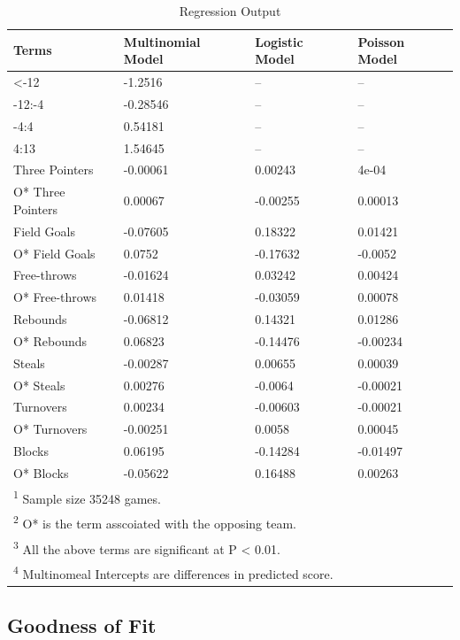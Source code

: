 \documentclass[
  man,floatsintext]{apa6}
\begin{document}
\begin{longtable}[t]{llll}
\caption{\label{tab:unnamed-chunk-5}Regression Output}\\
\toprule
Terms & Multinomial Model & Logistic Model & Poisson Model\\
\midrule
<-12 & -1.2516 & -- & --\\
-12:-4 & -0.28546 & -- & --\\
-4:4 & 0.54181 & -- & --\\
4:13 & 1.54645 & -- & --\\
Three Pointers & -0.00061 & 0.00243 & 4e-04\\
\addlinespace
O* Three Pointers & 0.00067 & -0.00255 & 0.00013\\
Field Goals & -0.07605 & 0.18322 & 0.01421\\
O* Field Goals & 0.0752 & -0.17632 & -0.0052\\
Free-throws & -0.01624 & 0.03242 & 0.00424\\
O* Free-throws & 0.01418 & -0.03059 & 0.00078\\
\addlinespace
Rebounds & -0.06812 & 0.14321 & 0.01286\\
O* Rebounds & 0.06823 & -0.14476 & -0.00234\\
Steals & -0.00287 & 0.00655 & 0.00039\\
O* Steals & 0.00276 & -0.0064 & -0.00021\\
Turnovers & 0.00234 & -0.00603 & -0.00021\\
\addlinespace
O* Turnovers & -0.00251 & 0.0058 & 0.00045\\
Blocks & 0.06195 & -0.14284 & -0.01497\\
O* Blocks & -0.05622 & 0.16488 & 0.00263\\
\bottomrule
\multicolumn{4}{l}{\rule{0pt}{1em}\textsuperscript{1} Sample size 35248 games.}\\
\multicolumn{4}{l}{\rule{0pt}{1em}\textsuperscript{2} O* is the term asscoiated with the opposing team.}\\
\multicolumn{4}{l}{\rule{0pt}{1em}\textsuperscript{3} All the above terms are significant at P < 0.01.}\\
\multicolumn{4}{l}{\rule{0pt}{1em}\textsuperscript{4} Multinomeal Intercepts are differences in predicted score.}\\
\end{longtable}

\hypertarget{goodness-of-fit}{%
\subsection{Goodness of Fit}\label{goodness-of-fit}}
\end{document}
